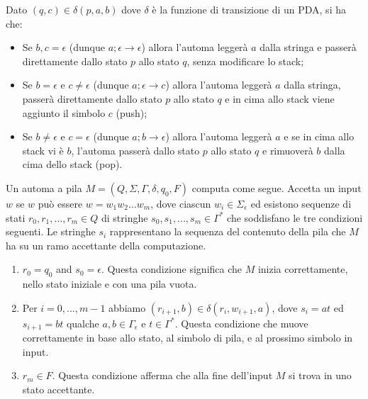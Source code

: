Dato $(q, c)\in\delta(p, a, b)$ dove $\delta$ è la funzione di transizione di un PDA, si ha che:
\begin{itemize}
    \item Se $b, c = \epsilon$ (dunque $a; \epsilon \to\epsilon$) allora l’automa leggerà $a$ dalla stringa e passerà direttamente dallo stato $p$ allo stato $q$, senza modificare lo stack;
    \item Se $b = \epsilon$ e $c\neq\epsilon$ (dunque $a; \epsilon \to c$) allora l’automa leggerà $a$ dalla stringa, passerà direttamente dallo stato $p$ allo stato $q$ e in cima allo stack viene aggiunto il simbolo $c$ (push);
    \item Se $b\neq \epsilon$ e $c = \epsilon$ (dunque $a; b \to\epsilon$) allora l’automa leggerà $a$ e se in cima allo stack vi è $b$, l’automa passerà dallo stato $p$ allo stato $q$ e rimuoverà $b$ dalla cima dello stack (pop).
\end{itemize}
Un automa a pila $M = (Q, \Sigma, \Gamma, \delta, q_{0}, F)$ computa come segue. Accetta un input $w$ se $w$ può essere $w= w_{1}w_{2}...w_m$, dove ciascun $w_{i} \in \Sigma_{\epsilon}$ ed esistono sequenze di stati $r_{0}, r_{1} ,...,r_{m}\in Q$ di stringhe $s_{0}, s_{1} ,...,s_m\in \Gamma^*$ che soddisfano le tre condizioni seguenti. Le stringhe $s_{i}$ rappresentano la sequenza del contenuto della pila che $M$ ha su un ramo accettante della computazione.
\begin{enumerate}
    \item $r_{0} = q_{0}$ and $s_{0} = \epsilon$. Questa condizione significa che $M$ inizia correttamente, nello stato iniziale e con una pila vuota.
    \item Per $i = 0 ,...,m-1$ abbiamo $(r_{i+1}, b)\in\delta(r_i, w_{i+1}, a)$, dove $s_{i} = at$ ed $s_{i+1}=bt$ qualche $a,b\in\Gamma_\epsilon$ e $t\in\Gamma^*$. Questa condizione che muove correttamente in base allo stato, al simbolo di pila, e al prossimo simbolo in input.
    \item $r_{m} \in F$. Questa condizione afferma che alla fine dell'input $M$ si trova in uno stato accettante.
\end{enumerate}

